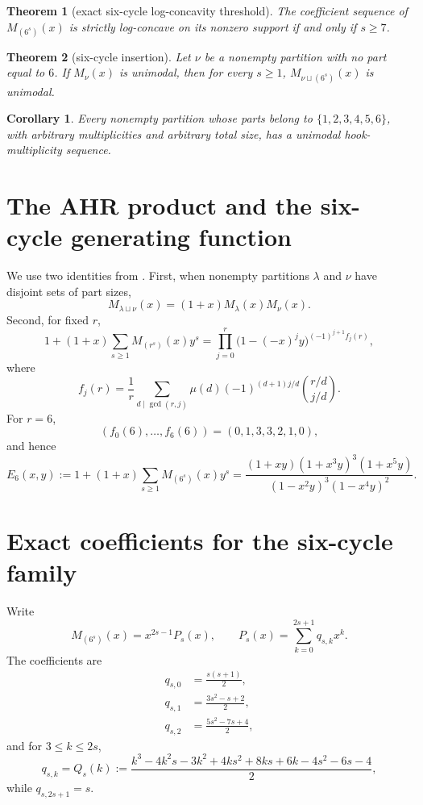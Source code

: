 \documentclass[11pt]{amsart}
\newtheorem{theorem}{Theorem}
\newtheorem{corollary}{Corollary}
\begin{document}
\begin{theorem}[exact six-cycle log-concavity threshold]\label{thm:threshold}
The coefficient sequence of \(M_{(6^s)}(x)\) is strictly log-concave on its nonzero support if and only if \(s\ge7\).
\end{theorem}

\begin{theorem}[six-cycle insertion]\label{thm:insertion}
Let \(\nu\) be a nonempty partition with no part equal to \(6\). If \(M_\nu(x)\) is unimodal, then for every \(s\ge1\), \(M_{\nu\sqcup(6^s)}(x)\) is unimodal.
\end{theorem}

\begin{corollary}\label{cor:parts-six}
Every nonempty partition whose parts belong to \(\{1,2,3,4,5,6\}\), with arbitrary multiplicities and arbitrary total size, has a unimodal hook-multiplicity sequence.
\end{corollary}

\section{The AHR product and the six-cycle generating function}
We use two identities from \cite{AHR}. First, when nonempty partitions \(\lambda\) and \(\nu\) have disjoint sets of part sizes,
\begin{equation}\label{eq:disjoint}
M_{\lambda\sqcup\nu}(x)=(1+x)M_\lambda(x)M_\nu(x).
\end{equation}
Second, for fixed \(r\),
\begin{equation}\label{eq:AHRproduct}
1+(1+x)\sum_{s\ge1}M_{(r^s)}(x)y^s
=\prod_{j=0}^r\bigl(1-(-x)^j y\bigr)^{(-1)^{j+1}f_j(r)},
\end{equation}
where
\[
f_j(r)=\frac1r\sum_{d\mid\gcd(r,j)}\mu(d)(-1)^{(d+1)j/d}\binom{r/d}{j/d}.
\]
For \(r=6\),
\[
(f_0(6),\ldots,f_6(6))=(0,1,3,3,2,1,0),
\]
and hence
\begin{equation}\label{eq:E6}
E_6(x,y):=1+(1+x)\sum_{s\ge1}M_{(6^s)}(x)y^s
=
\frac{(1+xy)(1+x^3y)^3(1+x^5y)}
{(1-x^2y)^3(1-x^4y)^2}.
\end{equation}

\section{Exact coefficients for the six-cycle family}
Write
\[
M_{(6^s)}(x)=x^{2s-1}P_s(x),\qquad P_s(x)=\sum_{k=0}^{2s+1}q_{s,k}x^k.
\]
The coefficients are
\begin{align}
q_{s,0}&=\frac{s(s+1)}2,\\
q_{s,1}&=\frac{3s^2-s+2}{2},\\
q_{s,2}&=\frac{5s^2-7s+4}{2},
\end{align}
and for \(3\le k\le2s\),
\begin{equation}\label{eq:Qs}
q_{s,k}=Q_s(k):=
\frac{k^3-4k^2s-3k^2+4ks^2+8ks+6k-4s^2-6s-4}{2},
\end{equation}
while \(q_{s,2s+1}=s\).
\end{document}
